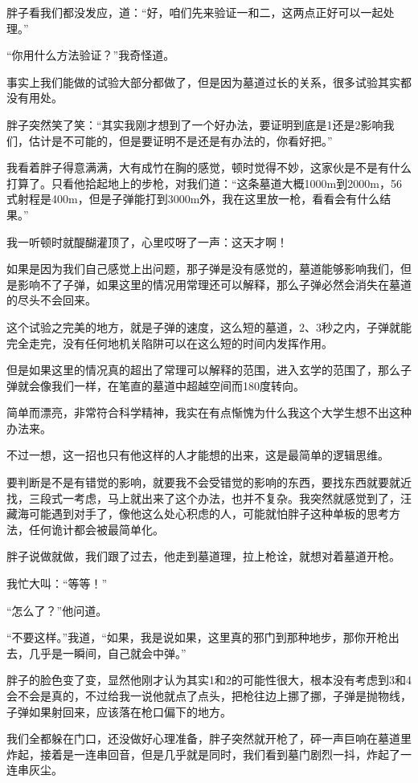 胖子看我们都没发应，道：“好，咱们先来验证一和二，这两点正好可以一起处理。”

“你用什么方法验证？”我奇怪道。

事实上我们能做的试验大部分都做了，但是因为墓道过长的关系，很多试验其实都没有用处。

胖子突然笑了笑：“其实我刚才想到了一个好办法，要证明到底是1还是2影响我们，估计是不可能的，但是要证明不是还是有办法的，你看好把。”

我看着胖子得意满满，大有成竹在胸的感觉，顿时觉得不妙，这家伙是不是有什么打算了。只看他拾起地上的步枪，对我们道：“这条墓道大概1000m到2000m，56式射程是400m，但是子弹能打到3000m外，我在这里放一枪，看看会有什么结果。”

我一听顿时就醍醐灌顶了，心里哎呀了一声：这天才啊！

如果是因为我们自己感觉上出问题，那子弹是没有感觉的，墓道能够影响我们，但是影响不了子弹，如果这里的情况用常理还可以解释，那么子弹必然会消失在墓道的尽头不会回来。

这个试验之完美的地方，就是子弹的速度，这么短的墓道，2、3秒之内，子弹就能完全走完，没有任何地机关陷阱可以在这么短的时间内发挥作用。

但是如果这里的情况真的超出了常理可以解释的范围，进入玄学的范围了，那么子弹就会像我们一样，在笔直的墓道中超越空间而180度转向。

简单而漂亮，非常符合科学精神，我实在有点惭愧为什么我这个大学生想不出这种办法来。

不过一想，这一招也只有他这样的人才能想的出来，这是最简单的逻辑思维。

要判断是不是有错觉的影响，就要我不会受错觉的影响的东西，要找东西就要就近找，三段式一考虑，马上就出来了这个办法，也并不复杂。我突然就感觉到了，汪藏海可能遇到对手了，像他这么处心积虑的人，可能就怕胖子这种单板的思考方法，任何诡计都会被最简单化。

胖子说做就做，我们跟了过去，他走到墓道理，拉上枪诠，就想对着墓道开枪。

我忙大叫：“等等！”

“怎么了？”他问道。

“不要这样。”我道，“如果，我是说如果，这里真的邪门到那种地步，那你开枪出去，几乎是一瞬间，自己就会中弹。”

胖子的脸色变了变，显然他刚才认为其实1和2的可能性很大，根本没有考虑到3和4会不会是真的，不过给我一说他就点了点头，把枪往边上挪了挪，子弹是抛物线，子弹如果射回来，应该落在枪口偏下的地方。

我们全都躲在门口，还没做好心理准备，胖子突然就开枪了，砰一声巨响在墓道里炸起，接着是一连串回音，但是几乎就是同时，我们看到墓门剧烈一抖，炸起了一连串灰尘。

